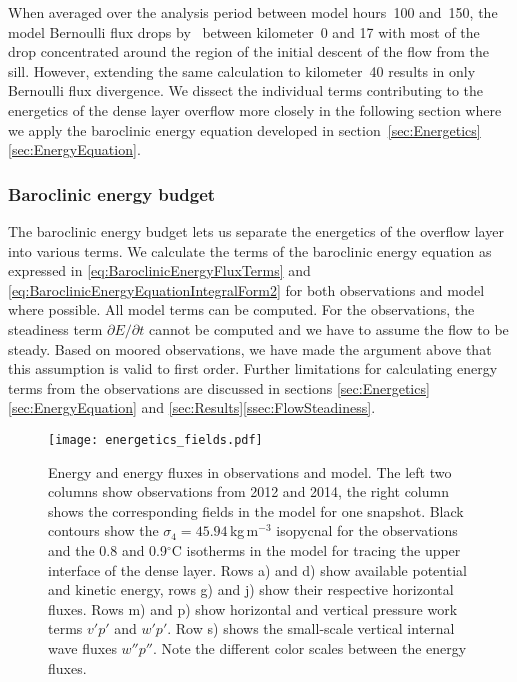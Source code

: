 \documentclass{ametsocV6.1}
\begin{document}
When averaged over the analysis period between model hours~100 and~150, the model Bernoulli flux drops by \ModelBernoulliDrop\,\ModelBernoulliDropUnit{} between kilometer~0 and 17 with most of the drop concentrated around the region of the initial descent of the flow from the sill.
However, extending the same calculation to kilometer~40 results in only \ModelBernoulliDropFarther\,\ModelBernoulliDropFartherUnit{} Bernoulli flux divergence.
We dissect the individual terms contributing to the energetics of the dense layer overflow more closely in the following section where we apply the baroclinic energy equation developed in section~\ref{sec:Energetics}\ref{sec:EnergyEquation}.

\subsubsection{Baroclinic energy budget}
The baroclinic energy budget lets us separate the energetics of the overflow layer into various terms.
We calculate the terms of the baroclinic energy equation as expressed in \eqref{eq:BaroclinicEnergyFluxTerms} and \eqref{eq:BaroclinicEnergyEquationIntegralForm2} for both observations and model where possible.
All model terms can be computed.
For the observations, the steadiness term $\partial E / \partial t$ cannot be computed and we have to assume the flow to be steady.
Based on moored observations, we have made the argument above that this assumption is valid to first order.
Further limitations for calculating energy terms from the observations are discussed in sections \ref{sec:Energetics}\ref{sec:EnergyEquation} and \ref{sec:Results}\ref{ssec:FlowSteadiness}.

\begin{figure*}
\centerline{\texttt{[image: energetics\_fields.pdf]}}
\caption{Energy and energy fluxes in observations and model.
The left two columns show observations from 2012 and 2014, the right column shows the corresponding fields in the model for one snapshot.
Black contours show the $\sigma_4=45.94$\,kg\,m$^{-3}$ isopycnal for the observations and the 0.8 and 0.9$^{\circ}$C isotherms in the model for tracing the upper interface of the dense layer.
Rows a) and d) show available potential and kinetic energy, rows g) and j) show their respective horizontal fluxes.
Rows m) and p) show horizontal and vertical pressure work terms $v'p'$ and $w'p'$.
Row s) shows the small-scale vertical internal wave fluxes $w''p''$.
Note the different color scales between the energy fluxes.
}
\label{fig:EnergeticsField}
\end{figure*}
\end{document}
